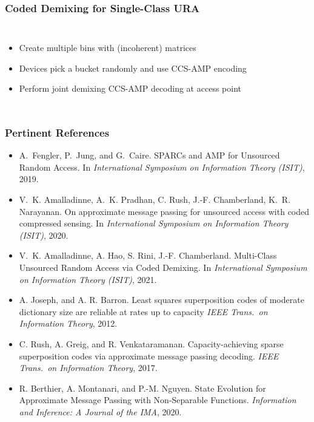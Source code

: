\begin{frame}
\frametitle{Coded Demixing for Single-Class URA}
\begin{columns}
  \centerline{}
  \begin{itemize}
  \item Create multiple bins with (incoherent) matrices
  \item Devices pick a bucket randomly and use CCS-AMP encoding
  \item Perform joint demixing CCS-AMP decoding at access point
  \end{itemize}
  \centerline{}
\end{columns}
\end{frame}


\begin{frame}
\frametitle{Pertinent References}
\begin{scriptsize}
\begin{itemize}
\item
A.~Fengler, P.~Jung, and G.~Caire.
SPARCs and AMP for Unsourced Random Access.
In \emph{International Symposium on Information Theory (ISIT)}, 2019.

\item
V.~K. Amalladinne, A.~K. Pradhan, C. Rush, J.-F. Chamberland, K.~R. Narayanan.
On approximate message passing for unsourced access with coded compressed sensing.
In \emph{International Symposium on Information Theory (ISIT)}, 2020.

\item
V.~K. Amalladinne, A. Hao, S. Rini, J.-F. Chamberland.
Multi-Class Unsourced Random Access via Coded Demixing.
In \emph{International Symposium on Information Theory (ISIT)}, 2021.

\item
A. Joseph, and A. R. Barron.
Least squares superposition codes of moderate dictionary size are reliable at rates up to capacity
\emph{IEEE Trans.\ on Information Theory}, 2012.

\item
C. Rush, A. Greig, and R. Venkataramanan.
Capacity-achieving sparse superposition codes via approximate message passing decoding.
\emph{IEEE Trans.\ on Information Theory}, 2017.

\item
R. Berthier, A. Montanari, and P.-M. Nguyen.
State Evolution for Approximate Message Passing with Non-Separable Functions.
\emph{Information and Inference: A Journal of the IMA}, 2020.
\end{itemize}
\end{scriptsize}
\end{frame}

